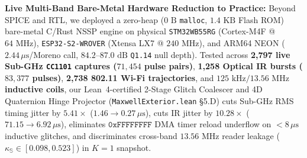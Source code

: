 \documentclass[12pt,letterpaper]{article}
\begin{document}
\begin{table}[h!]
\centering
\caption{Verified Baseline Performance Across Native 16D Sedenion Hardware Primitives}
\vspace{1pt}
\vspace{-5pt}
\end{table}

\textbf{Live Multi-Band Bare-Metal Hardware Reduction to Practice:} Beyond SPICE and RTL, we deployed a zero-heap ($0\text{ B}$ \texttt{malloc}, $1.4\text{ KB}$ Flash ROM) bare-metal C/Rust NSSP engine on physical \texttt{STM32WB55RG} (Cortex-M4F @ $64\text{ MHz}$), \texttt{ESP32-S2-WROVER} (Xtensa LX7 @ $240\text{ MHz}$), and ARM64 NEON ($2.44\,\mu\text{s}$/Moreno call, $84.2\text{--}87.0\text{ dB}$ \texttt{Q1.14} null depth). Tested across \textbf{2,797 live Sub-GHz \texttt{CC1101} captures ($71{,}454$ pulse pairs)}, \textbf{1,258 Optical IR bursts ($83{,}377$ pulses)}, \textbf{2,738 802.11 Wi-Fi trajectories}, and \textbf{$125\text{ kHz}/13.56\text{ MHz}$ inductive coils}, our Lean~4-certified 2-Stage Glitch Coalescer and 4D Quaternion Hinge Projector (\texttt{MaxwellExterior.lean} \S 5.D) cuts Sub-GHz RMS timing jitter by $\mathbf{5.41\times}$ ($1.46 \to 0.27\,\mu\text{s}$), cuts IR jitter by $\mathbf{10.28\times}$ ($71.15 \to 6.92\,\mu\text{s}$), eliminates $\mathtt{0xFFFFFFFF}$ DMA timer reload underflow on $<8\,\mu\text{s}$ inductive glitches, and discriminates cross-band $13.56\text{ MHz}$ reader leakage ($\kappa_{\mathbb{S}} \in [0.098, 0.523]$) in $K=1$ snapshot.
\end{document}
